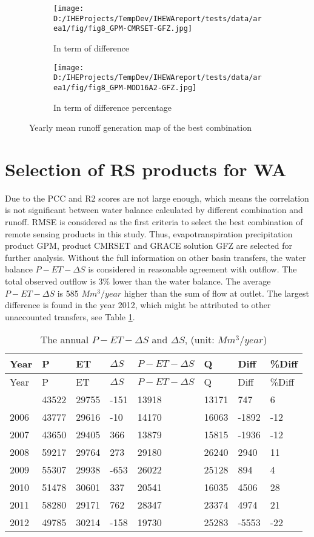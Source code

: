 \documentclass{article}%
\begin{document}
%


\begin{figure}[H]%
\begin{subfigure}[c]{0.5\textwidth}%
\texttt{[image: D:/IHEProjects/TempDev/IHEWAreport/tests/data/area1/fig/fig8\_GPM-CMRSET-GFZ.jpg]}%
\caption{In term of difference}%
\end{subfigure}%
\begin{subfigure}[c]{0.5\textwidth}%
\texttt{[image: D:/IHEProjects/TempDev/IHEWAreport/tests/data/area1/fig/fig8\_GPM-MOD16A2-GFZ.jpg]}%
\caption{In term of difference percentage}%
\end{subfigure}%
\caption{Yearly mean runoff generation map of the best combination}%
\label{figure:fig17}%
\end{figure}

%
\RaggedRight%
\section{Selection of RS products for WA}%
\label{sec:SelectionofRSproductsforWA}%
Due to the PCC and R2 scores are not large enough, which means the correlation is not significant between water balance calculated by different combination and runoff. RMSE is considered as the first criteria to select the best combination of remote sensing products in this study.%
\linebreak%
Thus, evapotranspiration precipitation product GPM, product CMRSET and GRACE solution GFZ are selected for further analysis.%
\linebreak%
Without the full information on other basin transfers, the water balance $P-ET-\Delta S$ is considered in reasonable agreement with outflow. The total observed outflow is 3\% lower than the water balance. The average $P-ET-\Delta S$ is 585 $Mm^3/year$ higher than the sum of flow at outlet. The largest difference is found in the year 2012, which might be attributed to other unaccounted transfers, see Table \ref{table:tab2}.%
\linebreak%
\begin{longtable}{|l|l|l|l|l|l|l|l|}%
\caption{The annual $P-ET-\Delta S$ and $\Delta S$, (unit: $Mm^3/year$)}%
\label{table:tab2}\\%
\hline%
Year&P&ET&$\Delta S$&$P-ET-\Delta S$&Q&Diff&\%Diff\\%
\hline%
\endfirsthead%
\hline%
Year&P&ET&$\Delta S$&$P-ET-\Delta S$&Q&Diff&\%Diff\\%
\hline%
\endhead%
\hline%
\endfoot%
2005&43522&29755&{-}151&13918&13171&747&6\\%
2006&43777&29616&{-}10&14170&16063&{-}1892&{-}12\\%
2007&43650&29405&366&13879&15815&{-}1936&{-}12\\%
2008&59217&29764&273&29180&26240&2940&11\\%
2009&55307&29938&{-}653&26022&25128&894&4\\%
2010&51478&30601&337&20541&16035&4506&28\\%
2011&58280&29171&762&28347&23374&4974&21\\%
2012&49785&30214&{-}158&19730&25283&{-}5553&{-}22\\%
\end{longtable}
\end{document}
